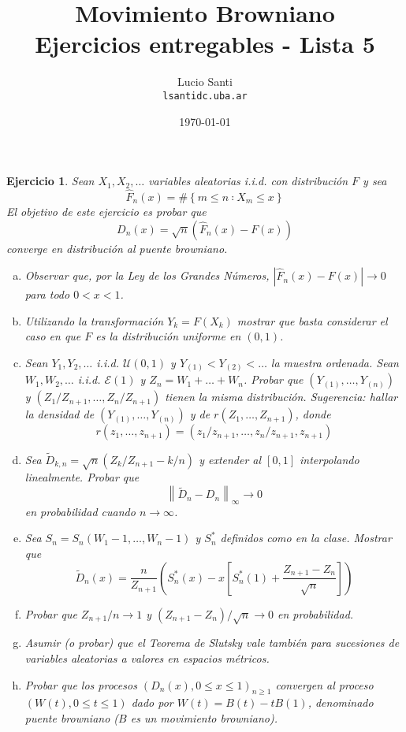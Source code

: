 \documentclass[a4paper,11pt]{article}
\title{Movimiento Browniano\\
      \small{Ejercicios entregables - Lista 5}}
\author{Lucio Santi\\
        \texttt{lsanti\at dc.uba.ar}}
\date{\today}
\newcommand{\abs}[1]{\ensuremath{\left\lvert #1 \right\rvert}}
\newcommand{\norm}[1]{\left\lVert#1\right\rVert}
\newcommand{\normi}[1]{\norm{#1}_{\infty}}
\newcommand{\Sst}[1]{S_n^{*}(#1)}
\newtheorem*{ej}{Ejercicio}
\begin{document}
\maketitle

\begin{ej} 
Sean $X_1, X_2, \dots$ variables aleatorias i.i.d. con distribución $F$ y sea
$$\hat{F}_n(x) = \#\left\{m \leq n ∶  X_m \leq x \right\}$$
El objetivo de este ejercicio es probar que
$$D_n(x) = \sqrt{n} (\hat{F}_n(x) − F(x))$$
converge en distribución al \textsl{puente browniano}.

\begin{enumerate}[a.]
    \item Observar que, por la Ley de los Grandes Números,
    $\abs{\hat{F}_n(x) − F (x)} \to 0$ para todo $0 < x < 1$.

    \item Utilizando la transformación $Y_k = F(X_k)$ mostrar que basta
    considerar el caso en que $F$ es la distribución uniforme en $(0, 1)$.

    \item Sean $Y_1, Y_2, \dots$ i.i.d. $\mathcal{U}(0, 1)$ y
    $Y_{(1)} < Y_{(2)} < \dots$ la muestra ordenada. Sean
    $W_1, W_2, \dots$ i.i.d. $\mathcal{E}(1)$ y
    $Z_n = W_1 + \dots + W_n$. Probar que
    $(Y_{(1)}, \dots, Y_{(n)})$ y $(Z_1/Z_{n+1}, \dots, Z_n/Z_{n+1})$
    tienen la misma distribución. Sugerencia: hallar la densidad de
    $(Y_{(1)}, \dots, Y_{(n)})$ y de $r(Z_1, \dots, Z_{n+1})$, donde
    $$r(z_1, \dots, z_{n+1}) = (z_1/z_{n+1}, \dots, z_n/z_{n+1}, z_{n+1})$$

    \item Sea $\tilde{D}_{k,n} = \sqrt{n} (Z_k/Z_{n+1} − k/n)$ y extender al
    $[0, 1]$ interpolando linealmente. Probar que
    $$\normi{\tilde{D}_n - D_n} \to 0$$
    en probabilidad cuando $n \to \infty$.

    \item Sea $S_n = S_n(W_1 − 1, \dots, W_n − 1)$ y $S_n^{*}$ definidos como
    en la clase. Mostrar que
    $$\tilde{D}_n(x) = \frac{n}{Z_{n+1}} \left(\Sst{x} - x \left[ \Sst{1} + \frac{Z_{n+1} - Z_n}{\sqrt{n}} \right] \right)$$

    \item Probar que $Z_{n+1}/n \to 1$ y 
    $(Z_{n+1} - Z_n)/\sqrt{n} \to 0$
    en probabilidad.

    \item Asumir (o probar) que el Teorema de Slutsky vale también para
    sucesiones de variables aleatorias a valores en espacios métricos.

    \item Probar que los procesos $(D_n(x), 0 \leq x \leq 1)_{n \geq 1}$
    convergen al proceso $(W(t), 0 \leq t \leq 1)$ dado por
    $W(t) = B(t) − tB(1)$,
    denominado \textsl{puente browniano} ($B$ es un movimiento browniano).
\end{enumerate}
\end{ej}
\end{document}
